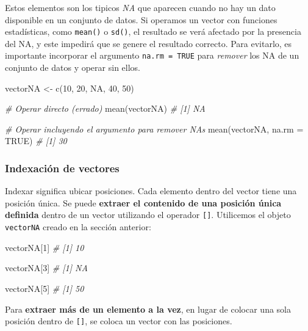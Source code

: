 \documentclass[
]{article}
\newenvironment{Shaded}{\begin{snugshade}}{\end{snugshade}}
\newcommand{\AttributeTok}[1]{\textcolor[rgb]{0.77,0.63,0.00}{#1}}
\newcommand{\CommentTok}[1]{\textcolor[rgb]{0.56,0.35,0.01}{\textit{#1}}}
\newcommand{\ConstantTok}[1]{\textcolor[rgb]{0.00,0.00,0.00}{#1}}
\newcommand{\DecValTok}[1]{\textcolor[rgb]{0.00,0.00,0.81}{#1}}
\newcommand{\FunctionTok}[1]{\textcolor[rgb]{0.00,0.00,0.00}{#1}}
\newcommand{\NormalTok}[1]{#1}
\newcommand{\OtherTok}[1]{\textcolor[rgb]{0.56,0.35,0.01}{#1}}
\theoremstyle{definition}
\theoremstyle{definition}
\theoremstyle{definition}
\theoremstyle{definition}
\theoremstyle{remark}
\begin{document}
Estos elementos son los tipicos \emph{NA} que aparecen cuando no hay un dato disponible en un conjunto de datos. Si operamos un vector con funciones estadísticas, como \texttt{mean()} o \texttt{sd()}, el resultado se verá afectado por la presencia del NA, y este impedirá que se genere el resultado correcto. Para evitarlo, es importante incorporar el argumento \texttt{na.rm\ =\ TRUE} para \emph{remover} los NA de un conjunto de datos y operar sin ellos.

\begin{Shaded}
\begin{Highlighting}[]
\NormalTok{vectorNA }\OtherTok{\textless{}{-}} \FunctionTok{c}\NormalTok{(}\DecValTok{10}\NormalTok{, }\DecValTok{20}\NormalTok{, }\ConstantTok{NA}\NormalTok{, }\DecValTok{40}\NormalTok{, }\DecValTok{50}\NormalTok{)}

\CommentTok{\# Operar directo (errado)}
\FunctionTok{mean}\NormalTok{(vectorNA)}
\CommentTok{\# [1] NA}

\CommentTok{\# Operar incluyendo el argumento para remover NAs}
\FunctionTok{mean}\NormalTok{(vectorNA, }\AttributeTok{na.rm =} \ConstantTok{TRUE}\NormalTok{)}
\CommentTok{\# [1] 30}
\end{Highlighting}
\end{Shaded}

\hypertarget{indexaciuxf3n-de-vectores}{%
\subsubsection{Indexación de vectores}\label{indexaciuxf3n-de-vectores}}

Indexar significa ubicar posiciones. Cada elemento dentro del vector tiene una posición única. Se puede \textbf{extraer el contenido de una posición única definida} dentro de un vector utilizando el operador \texttt{{[}{]}}. Utilicemos el objeto \texttt{vectorNA} creado en la sección anterior:

\begin{Shaded}
\begin{Highlighting}[]
\NormalTok{vectorNA[}\DecValTok{1}\NormalTok{]}
\CommentTok{\# [1] 10}

\NormalTok{vectorNA[}\DecValTok{3}\NormalTok{]}
\CommentTok{\# [1] NA}

\NormalTok{vectorNA[}\DecValTok{5}\NormalTok{]}
\CommentTok{\# [1] 50}
\end{Highlighting}
\end{Shaded}

Para \textbf{extraer más de un elemento a la vez}, en lugar de colocar una sola posición dentro de \texttt{{[}{]}}, se coloca un vector con las posiciones.
\end{document}
